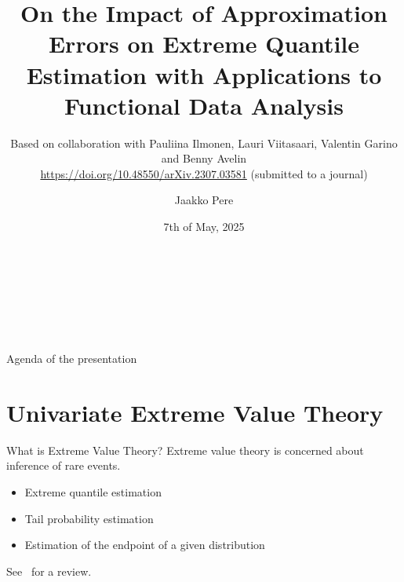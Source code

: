 \documentclass[11pt, aspectratio=169]{beamer}
\author[Jaakko Pere]{Jaakko Pere}
\title{On the Impact of Approximation Errors on Extreme Quantile Estimation with
Applications to Functional Data Analysis}
\subtitle{Based on collaboration with Pauliina Ilmonen, Lauri Viitasaari,
Valentin Garino and Benny Avelin \\
\url{https://doi.org/10.48550/arXiv.2307.03581} (submitted to a journal)}
\date{7th of May, 2025}
\institute{Dep.\ of Mathematics and Statistics, University of Helsinki}
\begin{document}
{
  \begin{frame}
    \vspace{2.5cm}
    \begin{center}
      \textcolor{hyblue}{\bf\MakeUppercase{\Large\inserttitle}} \\
      {\footnotesize\insertsubtitle} \\
      {\large\insertauthor} \\
      {\large\insertdate} \\
      {\large\insertinstitute}
    \end{center}
  \end{frame}
}

\begin{frame}{Agenda of the presentation}
  \tableofcontents
\end{frame}

\section{Univariate Extreme Value Theory}


\begin{frame}{What is Extreme Value Theory?}
  Extreme value theory is concerned about inference of rare events.
  \pause
  \vspace{\baselineskip}
  \begin{itemize}
    \item Extreme quantile estimation
    \item Tail probability estimation
    \item Estimation of the endpoint of a given distribution
  \end{itemize}
  \pause
  See~\cite{dehaan2006} for a review.
\end{frame}

\end{document}
